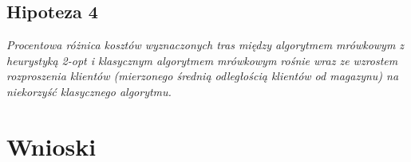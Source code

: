 \documentclass{article}
\begin{document}
\subsection{Hipoteza 4}
\textit{Procentowa różnica kosztów wyznaczonych tras między algorytmem mrówkowym z heurystyką 2-opt i klasycznym algorytmem mrówkowym rośnie wraz ze wzrostem rozproszenia klientów (mierzonego średnią odległością klientów od magazynu) na niekorzyść klasycznego algorytmu.}

\section{Wnioski}


\nocite{*}


\end{document}
